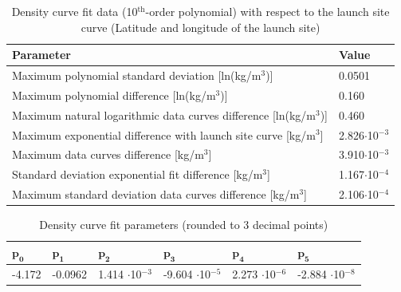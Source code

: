 \begin{table}[H]
\begin{center}
\caption{Density curve fit data (10$^\text{th}$-order polynomial) with respect to the launch site curve (Latitude and longitude of the launch site)}
\label{tab:fitDeviationsDen}
{\renewcommand{\arraystretch}{1.2} %
\begin{tabular}{|l|l|}
\hline
\textbf{Parameter} & \textbf{Value} \\ \hline \hline 
Maximum polynomial standard deviation [ln(kg/m$^{3}$)] & 0.0501 \\ \hline

  Maximum polynomial difference [ln(kg/m$^{3}$)] & 0.160 \\ \hline
  
Maximum natural logarithmic data curves difference [ln(kg/m$^{3}$)] & 0.460 \\ \hline
  
Maximum exponential difference with launch site curve [kg/m$^{3}$] & 2.826$\cdot$10$^{-3}$ \\ \hline
    
Maximum data curves difference [kg/m$^{3}$] & 3.910$\cdot$10$^{-3}$ \\ \hline
    
Standard deviation exponential fit difference [kg/m$^{3}$] & 1.167$\cdot$10$^{-4}$ \\ \hline 
      
Maximum standard deviation data curves difference [kg/m$^{3}$] & 2.106$\cdot$10$^{-4}$ \\ \hline
\end{tabular}}
\end{center}
\end{table}



\begin{table}[H]
\begin{center}
\caption{Density curve fit parameters (rounded to 3 decimal points)}
\label{tab:fitParametersDen}
{\renewcommand{\arraystretch}{1.2} %
\begin{tabular}{|l|l|l|l|l|l|}
\hline 
 $\mathbf{p_{0}}$ & $\mathbf{p_{1}}$ & $\mathbf{p_{2}}$ & $\mathbf{p_{3}}$ & $\mathbf{p_{4}}$ & $\mathbf{p_{5}}$  \\ \hline
 -4.172 & -0.0962 & 1.414 $\cdot$10$^{-3}$ & -9.604 $\cdot$10$^{-5}$ & 2.273 $\cdot$10$^{-6}$ & -2.884 $\cdot$10$^{-8}$  \\ \hline 
\end{tabular}
}
\end{center}
\end{table} 
 
